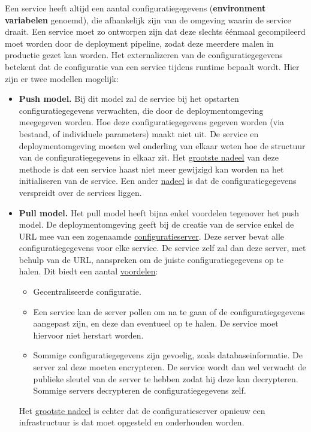 	Een service heeft altijd een aantal configuratiegegevens (\textbf{environment variabelen} genoemd), die afhankelijk zijn van de omgeving waarin de service draait. Een service moet zo ontworpen zijn dat deze slechts éénmaal gecompileerd moet worden door de deployment pipeline, zodat deze meerdere malen in productie gezet kan worden. Het externalizeren van de configuratiegegevens betekent dat de configuratie van een service tijdens runtime bepaalt wordt. Hier zijn er twee modellen mogelijk:
	\begin{itemize}
		\item[\info]\textbf{Push model.} Bij dit model zal de service bij het opstarten configuratiegegevens verwachten, die door de deploymentomgeving meegegeven worden. Hoe deze configuratiegegevens gegeven worden (via bestand, of individuele parameters) maakt niet uit. De service en deploymentomgeving moeten wel onderling van elkaar weten hoe de structuur van de configuratiegegevens in elkaar zit. Het \underline{grootste nadeel} van deze methode is dat een service haast niet meer gewijzigd kan worden na het initialiseren van de service. Een ander \underline{nadeel} is dat de configuratiegegevens verspreidt over de services liggen.
		\item[\info]\textbf{Pull model.} Het pull model heeft bijna enkel voordelen tegenover het push model. De deploymentomgeving geeft bij de creatie van de service enkel de URL mee van een zogenaamde \underline{configuratieserver}. Deze server bevat alle configuratiegegevens voor elke service. De service zelf zal dan deze server, met behulp van de URL, aanspreken om de juiste configuratiegegevens op te halen. Dit biedt een aantal \underline{voordelen}:
		\begin{itemize}
			\item[\info]Gecentraliseerde configuratie.
			\item[\info]Een service kan de server pollen om na te gaan of de configuratiegegevens aangepast zijn, en deze dan eventueel op te halen. De service moet hiervoor niet herstart worden.
			\item[\info]Sommige configuratiegegevens zijn gevoelig, zoals databaseinformatie. De server zal deze moeten encrypteren. De service wordt dan wel verwacht de publieke sleutel van de server te hebben zodat hij deze kan decrypteren. Sommige servers decrypteren de configuratiegegevens zelf.
		\end{itemize}
		Het \underline{grootste nadeel} is echter dat de configuratieserver opnieuw een infrastructuur is dat moet opgesteld en onderhouden worden.
	\end{itemize}

